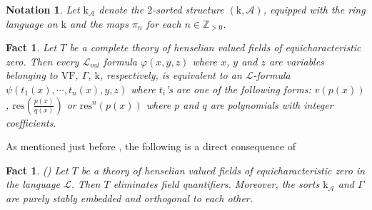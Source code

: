 \documentclass[12pt]{article}
\newcommand{\res}{\mathrm{res}}
\newcommand{\rv}{\mathrm{RV}}
\newcommand{\val}{\textit{v}}
\newcommand{\0}{\emptyset}
\newcommand{\vf}{\mathrm{VF}}
\newcommand{\vg}{\Gamma}
\newcommand{\rf}{\mathrm{k}}
\newcommand{\A}{\mathcal{A}}
\theoremstyle{plain}%
\newtheorem{fact}[thm]{Fact}
\newtheorem{notation}[thm]{Notation}
\theoremstyle{definition}
\newtheorem{defn}[thm]{Definition}
\theoremstyle{remark}
\begin{document}
\begin{notation}Let $\rf_{\A}$ denote the $2$-sorted structure $(\rf,\A)$, equipped with the ring language on $\rf$ and the maps $\pi_n$ for each $n\in \mathbb{Z}_{>0}$.\end{notation}
    







\begin{fact}\label{theorem_5.15_ACG22} Let $T$ be a complete theory of henselian valued fields of equicharacteristic zero. Then every $\mathcal{L}_{val}$ formula $\varphi(x,y,z)$ where $x$, $y$ and $z$ are variables belonging to $\vf$, $\vg$, $\rf$, respectively, is equivalent to an $\mathcal{L}$-formula  $\psi(t_1(x),\cdots, t_n(x), y,z)$ where $t_i$'s are one of the following forms: $\val(p(x))$, $\res(\frac{p(x)}{q(x)})$ or $\res^{n}(p(x))$ where $p$ and $q$ are polynomials with integer coefficients.
\end{fact}
As mentioned just before \cite[Theorem 2.23]{Vic22}, the following is a direct consequence of \cite[Theorem 5.15]{ACG22} 
\begin{fact}\label{QE_val_A}(\cite[Theorem 2.23, Corollary 2.24]{Vic22})
Let $T$ be a theory of henselian valued fields of equicharacteristic zero in the language $\mathcal{L}$. Then $T$ eliminates field quantifiers. Moreover, the sorts $\rf_{\mathcal{A}}$ and $\vg$ are purely stably embedded and orthogonal to each other.
\end{fact}
\end{document}
